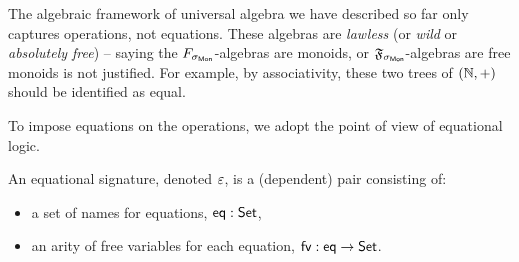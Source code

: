 The algebraic framework of universal algebra we have described so far only captures operations, not equations.
%
These algebras are \emph{lawless} (or \emph{wild} or \emph{absolutely free}) --
saying the $\SigMon$-algebras are monoids, or $\mathfrak{F}_{\sigma_{\mathsf{Mon}}}$-algebras are free monoids is not justified.
%
For example, by associativity, these two trees of $(\mathbb{N}, +)$ should be identified as equal.
\begin{center}
\end{center}
%
To impose equations on the operations, we adopt the point of view of equational logic.

\begin{definition}
    An equational signature, denoted $\varepsilon$, is a (dependent) pair consisting of:
    \begin{itemize}
        \item a set of names for equations, $\operatorname{\mathsf{eq}} : \mathsf{Set}$,
        \item an arity of free variables for each equation, $\operatorname{\mathsf{fv}} : \operatorname{\mathsf{eq}} \to \mathsf{Set}$.
    \end{itemize}
\end{definition}

